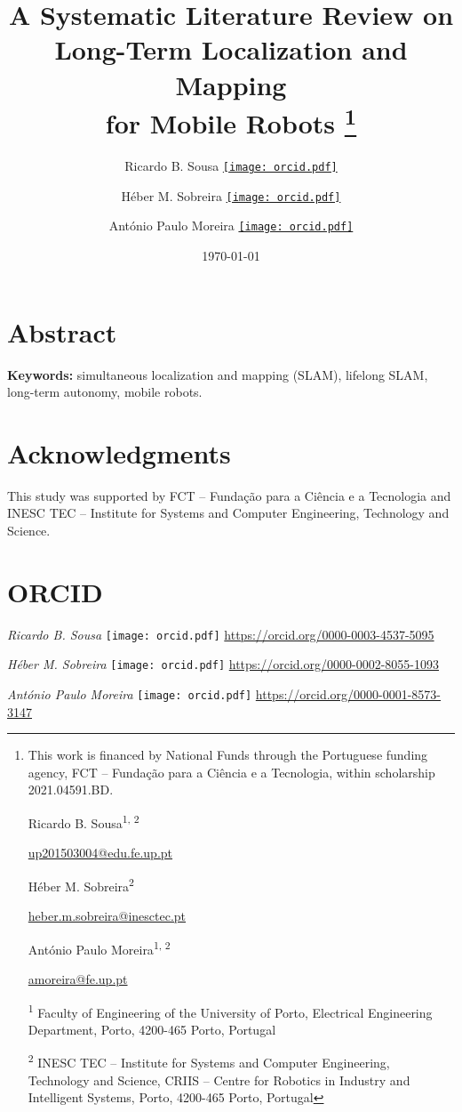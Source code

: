 \documentclass[10pt,a4paper,notitlepage,twocolumn,oneside]{article}
\title{A Systematic Literature Review on Long-Term Localization and Mapping\\for Mobile Robots%
\thanks{%
This work is financed by National Funds through the Portuguese funding agency, FCT -- Fundação para a Ciência e a Tecnologia, within scholarship 2021.04591.BD.

\vspace{1em}
\noindent Ricardo B. Sousa\textsuperscript{1, 2}

\noindent \href{mailto:up201503004@edu.fe.up.pt}{up201503004@edu.fe.up.pt}

\vspace{0.5em}
\noindent H\'{e}ber M. Sobreira\textsuperscript{2}

\noindent \href{mailto:heber.m.sobreira@inesctec.pt}{heber.m.sobreira@inesctec.pt}

\vspace{0.5em}
\noindent Ant\'{o}nio Paulo Moreira\textsuperscript{1, 2}

\noindent \href{mailto:amoreira@fe.up.pt}{amoreira@fe.up.pt}

\vspace{1em}
\noindent \textsuperscript{1} Faculty of Engineering of the University of Porto, Electrical Engineering Department, Porto, 4200-465 Porto, Portugal

\noindent \textsuperscript{2} INESC TEC -- Institute for Systems and Computer Engineering, Technology and Science, CRIIS -- Centre for Robotics in Industry and Intelligent Systems, Porto, 4200-465 Porto, Portugal
}}
\author{%
Ricardo B. Sousa
\href{https://orcid.org/0000-0003-4537-5095}{\texttt{[image: orcid.pdf]}}%
\and%
H\'{e}ber M. Sobreira
\href{https://orcid.org/0000-0002-8055-1093}{\texttt{[image: orcid.pdf]}}%
\and%
Ant\'{o}nio Paulo Moreira
\href{https://orcid.org/0000-0001-8573-3147}{\texttt{[image: orcid.pdf]}}%
}
\date{\today}
\begin{document}
\maketitle

\section*{Abstract}

\hfill\break

\noindent\textbf{Keywords:} simultaneous localization and mapping (SLAM), lifelong SLAM, long-term autonomy, mobile robots.



\section*{Acknowledgments}

This study was supported by FCT -- Fundação para a Ciência e a Tecnologia and INESC TEC -- Institute for Systems and Computer Engineering, Technology and Science.

\section*{ORCID}

\noindent \textit{Ricardo B. Sousa} \texttt{[image: orcid.pdf]} \href{https://orcid.org/0000-0003-4537-5095}{https://orcid.org/0000-0003-4537-5095}

\noindent \textit{H\'{e}ber M. Sobreira} \texttt{[image: orcid.pdf]} \href{https://orcid.org/0000-0002-8055-1093}{https://orcid.org/0000-0002-8055-1093}

\noindent \textit{Ant\'{o}nio Paulo Moreira} \texttt{[image: orcid.pdf]} \href{https://orcid.org/0000-0001-8573-3147}{https://orcid.org/0000-0001-8573-3147}




\printbibliography

%
%





\hfill\break
\end{document}
